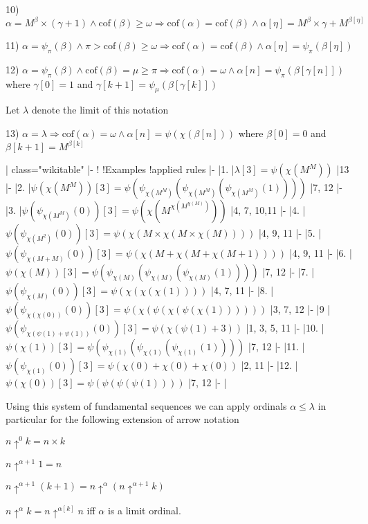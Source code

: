 \documentclass[10pt]{article}
\begin{document}
10) \(\alpha=M^\beta\times(\gamma+1) \wedge\text{cof}(\beta)\geq\omega \Rightarrow \text{cof}(\alpha)= \text{cof}(\beta) \wedge \alpha[\eta]=M^\beta\times\gamma+M^{\beta[\eta]}\)

11) \(\alpha=\psi_\pi(\beta) \wedge \pi>\text{cof}(\beta)\geq\omega \Rightarrow \text{cof} (\alpha)= \text{cof}(\beta) \wedge \alpha[\eta]=\psi_\pi(\beta[\eta])\)

12) \(\alpha=\psi_\pi(\beta) \wedge \text{cof}(\beta)=\mu\geq\pi \Rightarrow \text{cof} (\alpha)=\omega \wedge \alpha[n]=\psi _\pi(\beta[\gamma[n]])\) where  \(\gamma[0]=1\) and  \(\gamma[k+1]=\psi_\mu(\beta[\gamma[k]])\)

Let \(\lambda\) denote the limit of this notation

13) \(\alpha=\lambda\Rightarrow\text{cof} (\alpha)=\omega \wedge \alpha[n]=\psi(\chi(\beta[n]))\) where \(\beta[0]=0\) 
and \(\beta[k+1]=M^{\beta[k]}\)

{| class="wikitable"
|-
!
!Examples
!applied rules
|-
|1.
|\(\lambda[3]=\psi(\chi(M^M))\)
|13
|-
|2.
|\(\psi(\chi(M^M))[3]=\psi(\psi_{\chi(M^M)}(\psi_{\chi(M^M)}(\psi_{\chi(M^M)}(1))))\)
|7, 12
|-
|3.
|\(\psi(\psi_{\chi(M^M)}(0))[3]=\psi(\chi(M^{\chi(M^{\chi(M)})}))\)
|4, 7, 10,11
|-
|4.
|\(\psi(\psi_{\chi(M^2)}(0))[3]=\psi(\chi(M\times\chi(M\times\chi(M))))\)
|4, 9, 11
|-
|5.
|\(\psi(\psi_{\chi(M+M)}(0))[3]=\psi(\chi(M+\chi(M+\chi(M+1))))\)
|4, 9, 11
|-
|6.
|\(\psi(\chi(M))[3]=\psi(\psi_{\chi(M)}(\psi_{\chi(M)}(\psi_{\chi(M)}(1))))\)
|7, 12
|-
|7.
|\(\psi(\psi_{\chi(M)}(0))[3]=\psi(\chi(\chi(\chi(1))))\)
|4, 7, 11
|-
|8.
|\(\psi(\psi_{\chi(\chi(0))}(0))[3]=\psi(\chi(\psi(\chi(\psi(\chi(1))))))\)
|3, 7, 12
|-
|9
|\(\psi(\psi_{\chi(\psi(1)+\psi(1))}(0))[3]=\psi(\chi(\psi(1)+3))\)
|1, 3, 5, 11
|-
|10.
|\(\psi(\chi(1))[3]=\psi(\psi_{\chi(1)}(\psi_{\chi(1)}(\psi_{\chi(1)}(1))))\)
|7, 12
|-
|11.
|\(\psi(\psi_{\chi(1)}(0))[3]=\psi(\chi(0)+\chi(0)+\chi(0))\)
|2, 11
|-
|12.
|\(\psi(\chi(0))[3]=\psi(\psi(\psi(\psi(1))))\)
|7, 12
|-
|}

Using this system of fundamental sequences we can apply ordinals \(\alpha\le\lambda\) in particular for the following extension of arrow notation 

\(n\uparrow^0 k=n\times k\)

\(n\uparrow^{\alpha+1}1=n\)

\(n\uparrow^{\alpha+1}(k+1)=n\uparrow^{\alpha}(n\uparrow^{\alpha+1}k)\)

\(n\uparrow^{\alpha}k=n\uparrow^{\alpha[k]}n\) iff \(\alpha\) is a limit ordinal.
\end{document}
